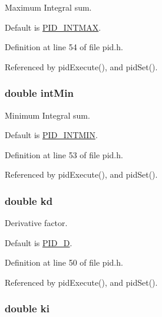 Maximum Integral sum. 

Default is \hyperlink{group__config_ga50582411cbb3f8a20ffd3aa2254ddf71}{P\-I\-D\-\_\-\-I\-N\-T\-M\-A\-X}. 

Definition at line 54 of file pid.\-h.



Referenced by pid\-Execute(), and pid\-Set().

\hypertarget{struct_p_i_d_state_a76c3abc852d5003bd3a2b1cdaa09b80c}{
\subsubsection[{int\-Min}]{\setlength{\rightskip}{0pt plus 5cm}double int\-Min}}\label{struct_p_i_d_state_a76c3abc852d5003bd3a2b1cdaa09b80c}


Minimum Integral sum. 

Default is \hyperlink{group__config_ga9ee651f30455f25b5ca4c4bb9a0a6e49}{P\-I\-D\-\_\-\-I\-N\-T\-M\-I\-N}. 

Definition at line 53 of file pid.\-h.



Referenced by pid\-Execute(), and pid\-Set().

\hypertarget{struct_p_i_d_state_a1cf17dd45e85748457863776dcb28335}{
\subsubsection[{kd}]{\setlength{\rightskip}{0pt plus 5cm}double kd}}\label{struct_p_i_d_state_a1cf17dd45e85748457863776dcb28335}


Derivative factor. 

Default is \hyperlink{group__config_ga2a442b8579a5c5f9526e824165125497}{P\-I\-D\-\_\-\-D}. 

Definition at line 50 of file pid.\-h.



Referenced by pid\-Execute(), and pid\-Set().

\hypertarget{struct_p_i_d_state_a23e09706a4abb026e1de279c4904e926}{
\subsubsection[{ki}]{\setlength{\rightskip}{0pt plus 5cm}double ki}}\label{struct_p_i_d_state_a23e09706a4abb026e1de279c4904e926}



